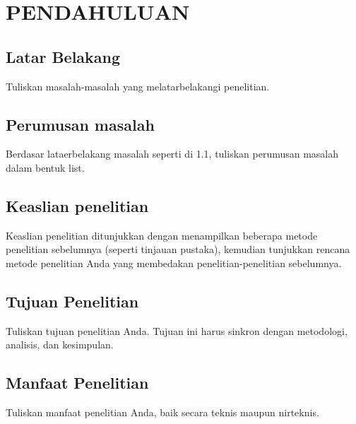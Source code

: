 \chapter{PENDAHULUAN}

\section{Latar Belakang}
	Tuliskan masalah-masalah yang melatarbelakangi penelitian.
	
\section{Perumusan masalah}
	Berdasar lataerbelakang masalah seperti di 1.1, tuliskan perumusan masalah dalam bentuk list. 
	
\section{Keaslian penelitian}
	Keaslian penelitian ditunjukkan dengan menampilkan beberapa metode penelitian sebelumnya (seperti tinjauan pustaka), kemudian tunjukkan rencana metode penelitian Anda yang membedakan penelitian-penelitian sebelumnya.
	
\section{Tujuan Penelitian}
	Tuliskan tujuan penelitian Anda. Tujuan ini harus sinkron dengan metodologi, analisis, dan kesimpulan.
		
\section{Manfaat Penelitian}
	Tuliskan manfaat penelitian Anda, baik secara teknis maupun nirteknis. 